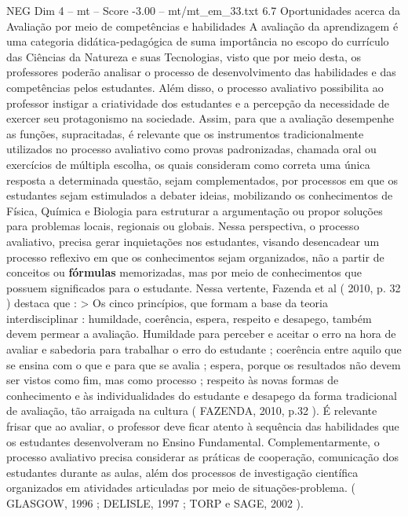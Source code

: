 \begin{textsample}{NEG Dim 4 – mt – Score -3.00 – mt/mt\_em\_33.txt}  \label{ex:f4_neg_115}
6.7 Oportunidades acerca da Avaliação por meio de competências e habilidades A avaliação da aprendizagem é uma categoria didática-pedagógica de suma importância no escopo do currículo das Ciências da Natureza e suas Tecnologias, visto que por meio desta, os professores poderão analisar o processo de desenvolvimento das habilidades e das competências pelos estudantes.
Além disso, o processo avaliativo possibilita ao professor instigar a criatividade dos estudantes e a percepção da necessidade de exercer seu protagonismo na sociedade.
Assim, para que a avaliação desempenhe as funções, supracitadas, é relevante que os instrumentos tradicionalmente utilizados no processo avaliativo como provas padronizadas, chamada oral ou exercícios de múltipla escolha, os quais consideram como correta uma única resposta a determinada questão, sejam complementados, por processos em que os estudantes sejam estimulados a debater ideias, mobilizando os conhecimentos de Física, Química e Biologia para estruturar a argumentação ou propor soluções para problemas locais, regionais ou globais.
Nessa perspectiva, o processo avaliativo, precisa gerar inquietações nos estudantes, visando desencadear um processo reflexivo em que os conhecimentos sejam organizados, não a partir de conceitos ou \textbf{fórmulas} memorizadas, mas por meio de conhecimentos que possuem significados para o estudante.
Nessa vertente, Fazenda et al ( 2010, p. 32 ) destaca que : > Os cinco princípios, que formam a base da teoria interdisciplinar : humildade, coerência, espera, respeito e desapego, também devem permear a avaliação.
Humildade para perceber e aceitar o erro na hora de avaliar e sabedoria para trabalhar o erro do estudante ; coerência entre aquilo que se ensina com o que e para que se avalia ; espera, porque os resultados não devem ser vistos como fim, mas como processo ; respeito às novas formas de conhecimento e às individualidades do estudante e desapego da forma tradicional de avaliação, tão arraigada na cultura ( FAZENDA, 2010, p.32 ).
É relevante frisar que ao avaliar, o professor deve ficar atento à sequência das habilidades que os estudantes desenvolveram no Ensino Fundamental.
Complementarmente, o processo avaliativo precisa considerar as práticas de cooperação, comunicação dos estudantes durante as aulas, além dos processos de investigação científica organizados em atividades articuladas por meio de situações-problema. ( GLASGOW, 1996 ; DELISLE, 1997 ; TORP e SAGE, 2002 ).

\end{textsample}

